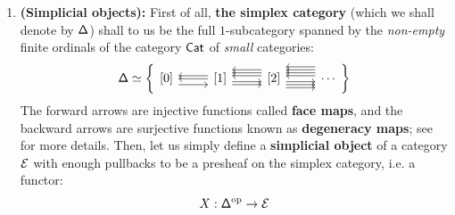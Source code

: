                 \begin{definition} \label{def: hypercovers}  
                    \noindent
                    \begin{enumerate}
                        \item \textbf{(Simplicial objects):} First of all, \textbf{the simplex category} (which we shall denote by $\mathsf{\Delta}$) shall to us be the full $1$-subcategory spanned by the \textit{non-empty} finite ordinals of the category $\mathsf{Cat}$ of \textit{small} categories:
                            $$\simp \cong
                                \left\{
                                    \begin{tikzcd}
                                    	{[0]} & {[1]} & {[2]} & \cdots
                                    	\arrow[shift right=2, from=1-1, to=1-2]
                                    	\arrow[shift right=1, from=1-2, to=1-1]
                                    	\arrow[from=1-2, to=1-1]
                                    	\arrow[shift right=2, from=1-2, to=1-3]
                                    	\arrow[shift right=1, from=1-2, to=1-3]
                                    	\arrow[shift right=1, from=1-3, to=1-2]
                                    	\arrow[shift right=2, from=1-3, to=1-2]
                                    	\arrow[shift right=3, from=1-3, to=1-2]
                                    	\arrow[shift right=1, from=1-4, to=1-3]
                                    	\arrow[shift right=2, from=1-4, to=1-3]
                                    	\arrow[shift right=3, from=1-4, to=1-3]
                                    	\arrow[shift right=2, from=1-3, to=1-4]
                                    	\arrow[shift right=1, from=1-3, to=1-4]
                                    	\arrow[shift right=4, from=1-4, to=1-3]
                                    	\arrow[shift right=3, from=1-3, to=1-4]
                                    \end{tikzcd}
                                \right\}
                            $$
                        The forward arrows are injective functions called \textbf{face maps}, and the backward arrows are surjective functions known as \textbf{degeneracy maps}; see \cite[Definition 2.2]{nlab:simplicial_set} for more details. Then, let us simply define a \textbf{simplicial object} of a category $\mathcal{E}$ with enough pullbacks to be a presheaf on the simplex category, i.e. a functor:
                            $$X: \mathsf{\Delta}^{\mathrm{op}} \to \mathcal{E}$$

\end{enumerate}
\end{definition}
